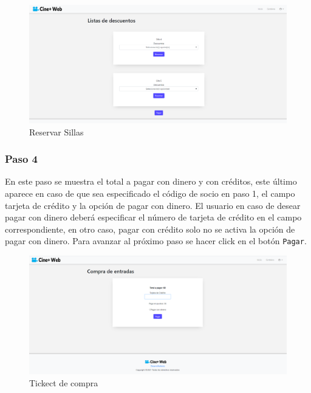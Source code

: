 \begin{figure}[h!]
	\centering
	\includegraphics[scale=0.35]{./chapters/img/reserve.png}
	
	\label{fig:reserve}
	\caption{Reservar Sillas}
\end{figure}

\subsubsection{Paso 4}
En este paso se muestra el total a pagar con dinero y con cr\'editos, este \'ultimo aparece en caso de que sea especificado el c\'odigo de socio en paso 1, el campo tarjeta de cr\'edito y la opci\'on de pagar con dinero. El usuario en caso de desear pagar con dinero deber\'a especificar el n\'umero de tarjeta de cr\'edito en el campo correspondiente, en otro caso, pagar con cr\'edito solo no se activa la opci\'on de pagar con dinero. Para avanzar al pr\'oximo paso se hacer click en el bot\'on \verb*|Pagar|.

\begin{figure}[h!]
	\centering
	\includegraphics[scale=0.35]{./chapters/img/ticketpurchase2.png}
	
	\label{fig:ticketpurchase2}
	\caption{Tickect de compra}
	
\end{figure}


